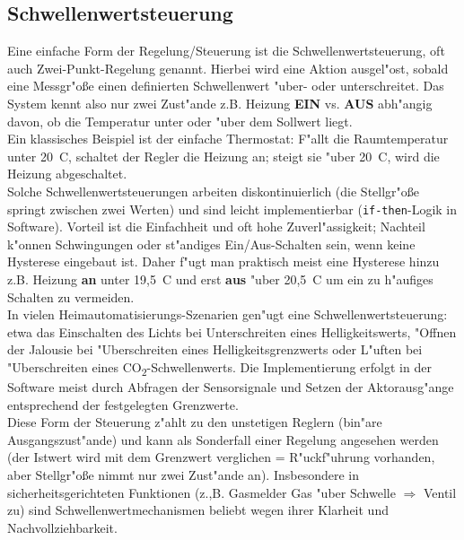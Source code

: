 \subsection*{Schwellenwertsteuerung}
Eine einfache Form der Regelung/Steuerung ist die Schwellenwertsteuerung, oft auch Zwei-Punkt-Regelung genannt. Hierbei wird eine Aktion ausgel"ost, sobald eine Messgr"o\ss e einen definierten Schwellenwert "uber- oder unterschreitet. Das System kennt also nur zwei Zust"ande \textendash{} z.B. Heizung \textbf{EIN} vs. \textbf{AUS} abh"angig davon, ob die Temperatur unter oder "uber dem Sollwert liegt.
\\
Ein klassisches Beispiel ist der einfache Thermostat: F"allt die Raumtemperatur unter 20~\textdegree{}C, schaltet der Regler die Heizung an; steigt sie "uber 20~\textdegree{}C, wird die Heizung abgeschaltet. \autocite{haustechnik}
\\
Solche Schwellenwertsteuerungen arbeiten diskontinuierlich (die Stellgr"o\ss e springt zwischen zwei Werten) und sind leicht implementierbar (\texttt{if-then}-Logik in Software). Vorteil ist die Einfachheit und oft hohe Zuverl"assigkeit; Nachteil k"onnen Schwingungen oder st"andiges Ein/Aus-Schalten sein, wenn keine Hysterese eingebaut ist. Daher f"ugt man praktisch meist eine Hysterese hinzu \textendash{} z.B. Heizung \textbf{an} unter 19,5~\textdegree{}C und erst \textbf{aus} "uber 20,5~\textdegree{}C \textendash{} um ein zu h"aufiges Schalten zu vermeiden.
\\
In vielen Heimautomatisierungs-Szenarien gen"ugt eine Schwellenwertsteuerung: etwa das Einschalten des Lichts bei Unterschreiten eines Helligkeitswerts, "Offnen der Jalousie bei "Uberschreiten eines Helligkeitsgrenzwerts oder L"uften bei "Uberschreiten eines CO\textsubscript{2}-Schwel\-len\-werts. Die Implementierung erfolgt in der Software meist durch Abfragen der Sensorsignale und Setzen der Aktorausg"ange entsprechend der festgelegten Grenzwerte.
\\
Diese Form der Steuerung z"ahlt zu den unstetigen Reglern (bin"are Ausgangszust"ande) und kann als Sonderfall einer Regelung angesehen werden (der Istwert wird mit dem Grenzwert verglichen = R"uckf"uhrung vorhanden, aber Stellgr"o\ss e nimmt nur zwei Zust"ande an). Insbesondere in sicherheitsgerichteten Funktionen (z.,B. Gasmelder \textendash{} Gas "uber Schwelle $\Rightarrow$ Ventil zu) sind Schwellenwertmechanismen beliebt wegen ihrer Klarheit und Nachvollziehbarkeit.
\\
